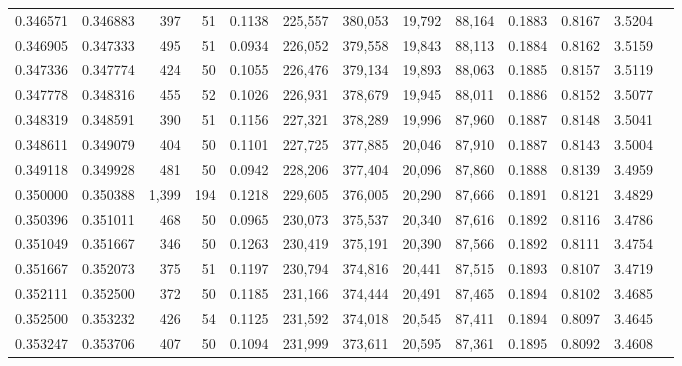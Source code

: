 \begin{tabular}{rrrrrrrrrrrrr}
0.346571 & 0.346883 &    397 &    51 &                                     0.1138 & 225,557 & 380,053 &  19,792 &  88,164 & 0.1883 & 0.8167 & 3.5204 \\
0.346905 & 0.347333 &    495 &    51 &                                     0.0934 & 226,052 & 379,558 &  19,843 &  88,113 & 0.1884 & 0.8162 & 3.5159 \\
0.347336 & 0.347774 &    424 &    50 &                                     0.1055 & 226,476 & 379,134 &  19,893 &  88,063 & 0.1885 & 0.8157 & 3.5119 \\
0.347778 & 0.348316 &    455 &    52 &                                     0.1026 & 226,931 & 378,679 &  19,945 &  88,011 & 0.1886 & 0.8152 & 3.5077 \\
0.348319 & 0.348591 &    390 &    51 &                                     0.1156 & 227,321 & 378,289 &  19,996 &  87,960 & 0.1887 & 0.8148 & 3.5041 \\
0.348611 & 0.349079 &    404 &    50 &                                     0.1101 & 227,725 & 377,885 &  20,046 &  87,910 & 0.1887 & 0.8143 & 3.5004 \\
0.349118 & 0.349928 &    481 &    50 &                                     0.0942 & 228,206 & 377,404 &  20,096 &  87,860 & 0.1888 & 0.8139 & 3.4959 \\
0.350000 & 0.350388 &  1,399 &   194 &                                     0.1218 & 229,605 & 376,005 &  20,290 &  87,666 & 0.1891 & 0.8121 & 3.4829 \\
0.350396 & 0.351011 &    468 &    50 &                                     0.0965 & 230,073 & 375,537 &  20,340 &  87,616 & 0.1892 & 0.8116 & 3.4786 \\
0.351049 & 0.351667 &    346 &    50 &                                     0.1263 & 230,419 & 375,191 &  20,390 &  87,566 & 0.1892 & 0.8111 & 3.4754 \\
0.351667 & 0.352073 &    375 &    51 &                                     0.1197 & 230,794 & 374,816 &  20,441 &  87,515 & 0.1893 & 0.8107 & 3.4719 \\
0.352111 & 0.352500 &    372 &    50 &                                     0.1185 & 231,166 & 374,444 &  20,491 &  87,465 & 0.1894 & 0.8102 & 3.4685 \\
0.352500 & 0.353232 &    426 &    54 &                                     0.1125 & 231,592 & 374,018 &  20,545 &  87,411 & 0.1894 & 0.8097 & 3.4645 \\
0.353247 & 0.353706 &    407 &    50 &                                     0.1094 & 231,999 & 373,611 &  20,595 &  87,361 & 0.1895 & 0.8092 & 3.4608 \\

\end{tabular}
